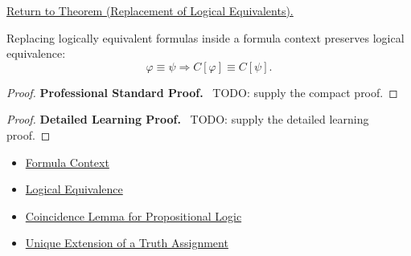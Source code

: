 \newpage
{}
\label{prf:replacement-of-logical-equivalents-propositional-logic}

\begin{remark*}[Return]
\hyperref[thm:replacement-of-logical-equivalents-propositional-logic]{Return to Theorem (Replacement of Logical Equivalents).}
\end{remark*}

\begin{theorem*}
Replacing logically equivalent formulas inside a formula context preserves logical equivalence:
\[
\varphi\equiv\psi
\Longrightarrow
C[\varphi]\equiv C[\psi].
\]
\end{theorem*}

\begin{proof}
\textbf{Professional Standard Proof.}~
TODO: supply the compact proof.
\end{proof}

\begin{proof}
\textbf{Detailed Learning Proof.}~
TODO: supply the detailed learning proof.
\end{proof}

\begin{remark*}
\end{remark*}

\begin{dependencies}
\begin{itemize}
  \item \hyperref[def:formula-context-propositional-logic]{Formula Context}
  \item \hyperref[def:logical-equivalence-propositional-logic]{Logical Equivalence}
  \item \hyperref[lem:coincidence-lemma-propositional-logic]{Coincidence Lemma for Propositional Logic}
  \item \hyperref[thm:unique-extension-truth-assignment-propositional-logic]{Unique Extension of a Truth Assignment}
\end{itemize}
\end{dependencies}

\clearpage

